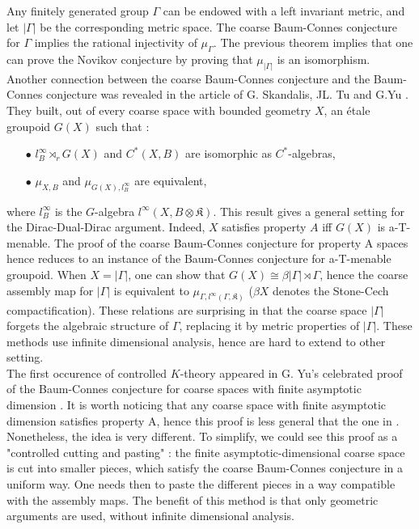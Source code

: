 Any finitely generated group $\Gamma$ can be endowed with a left invariant metric, and let $|\Gamma|$ be the corresponding metric space. The coarse Baum-Connes conjecture for $\Gamma$ implies the rational injectivity of $\mu_\Gamma$. The previous theorem implies that one can prove the Novikov conjecture by proving that $\mu_{|\Gamma|}$ is an isomorphism. \\

Another connection between the coarse Baum-Connes conjecture and the Baum-Connes conjecture was revealed in the article of G. Skandalis, JL. Tu and G.Yu \cite{SkTuYu}. They built, out of every coarse space with bounded geometry $X$, an étale groupoid $G(X)$ such that :\\
\begin{itemize}
\item[$\bullet$] $l^\infty_B \rtimes_r G(X)$ and $C^*(X,B)$ are isomorphic as $C^*$-algebras,
\item[$\bullet$] $\mu_{X,B}$ and $\mu_{G(X),l^\infty_B}$ are equivalent,\\
\end{itemize}
where $l^\infty_B$ is the $G$-algebra $l^\infty(X,B\otimes\mathfrak K)$. This result gives a general setting for the Dirac-Dual-Dirac argument. Indeed, $X$ satisfies property $A$ iff $G(X)$ is a-T-menable. The proof of the coarse Baum-Connes conjecture for property A spaces hence reduces to an instance of the Baum-Connes conjecture for a-T-menable groupoid. When $X=|\Gamma|$, one can show that $G(X) \cong \beta |\Gamma| \rtimes \Gamma$, hence the coarse assembly map for $|\Gamma|$ is equivalent to $\mu_{\Gamma,l^\infty(\Gamma, \mathfrak K)}$ \cite{SkTuYu} ($\beta X$ denotes the Stone-Cech compactification). These relations are surprising in that the coarse space $|\Gamma|$ forgets the algebraic structure of $\Gamma$, replacing it by metric properties of $|\Gamma|$. These methods use infinite dimensional analysis, hence are hard to extend to other setting.\\ %

The first occurence of controlled $K$-theory appeared in G. Yu's celebrated proof of the Baum-Connes conjecture for coarse spaces with finite asymptotic dimension \cite{Yu1}. It is worth noticing that any coarse space with finite asymptotic dimension satisfies property A, hence this proof is less general that the one in \cite{Yu2}. Nonetheless, the idea is very different. To simplify, we could see this proof as a "controlled cutting and pasting" : the finite asymptotic-dimensional coarse space is cut into smaller pieces, which satisfy the coarse Baum-Connes conjecture in a uniform way. One needs then to paste the different pieces in a way compatible with the assembly maps. The benefit of this method is that only geometric arguments are used, without infinite dimensional analysis. \\ %

